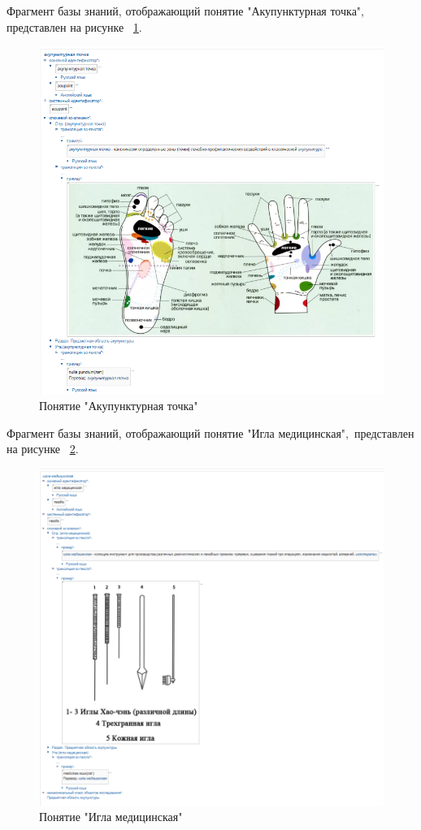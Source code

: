 Фрагмент базы знаний, отображающий  понятие "Акупунктурная точка"$,$ представлен на рисунке
~\ref{fig:sections/concept_acupoint}.
\begin{figure}[H]
	\centering
	\includegraphics[width=1.0\textwidth]{sections/concept_acupoint.png}
	\caption{Понятие "Акупунктурная точка"}
	\label{fig:sections/concept_acupoint}
\end{figure}

Фрагмент базы знаний, отображающий  понятие "Игла медицинская"$,$ представлен на рисунке
~\ref{fig:sections/concept_needle}.
\begin{figure}[H]
	\centering
	\includegraphics[width=1.0\textwidth]{sections/concept_needle.png}
	\caption{Понятие "Игла медицинская"}
	\label{fig:sections/concept_needle}
\end{figure}

